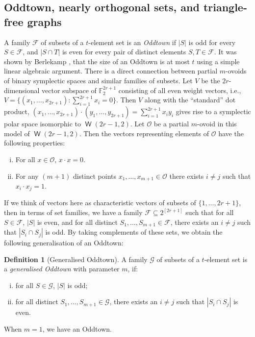 \documentclass[a4paper,11pt]{amsproc}
\theoremstyle{plain}
\theoremstyle{definition}
\newtheorem{Definition} [Theorem] {Definition}
\newcommand{\<}{\langle}
\renewcommand{\>}{\rangle} %
\DeclareMathOperator\w{\mathsf{W}}
\begin{document}
\subsection{Oddtown, nearly orthogonal sets, and triangle-free graphs}\label{connections}

A family $\mathcal{F}$ of subsets of a $t$-element set is an \emph{Oddtown} if $|S|$ is odd for every 
$S\in \mathcal{F}$, and $|S\cap T|$ is even for every pair of distinct elements $S,T\in\mathcal{F}$.
It was shown by Berlekamp \cite{Berlekamp}, that the size of an Oddtown is at most $t$ using a simple linear algebraic argument. There is a direct connection between partial $m$-ovoids of binary symplectic spaces and 
similar families of subsets. Let $V$ be the $2r$-dimensional vector subspace of $\mathbb{F}_2^{2r + 1}$ consisting of all even weight vectors, i.e., $V = \{(x_1, \dots, x_{2r + 1}) : \sum_{i = 1}^{2r + 1} x_i = 0\}$. Then $V$ along with the ``standard'' dot product, $(x_1, \dots, x_{2r + 1}) \cdot (y_1, \dots, y_{2r+1}) = \sum_{i = 1}^{2r+1} x_i y_i$ gives rise to a symplectic polar space isomorphic to $\w(2r - 1, 2)$. 
Let $\mathcal{O}$ be a partial $m$-ovoid in this model of $\w(2r - 1, 2)$. 
Then the vectors representing elements of $\mathcal{O}$ have the following properties:
\begin{enumerate}[(i)]
    \item For all $x \in \mathcal{O}$, $x \cdot x = 0$. 
    \item For any $(m + 1)$ distinct points $x_1, \dots, x_{m + 1} \in \mathcal{O}$ there exists $i \neq j$ such that $x_i \cdot x_j = 1$. 
\end{enumerate}
If we think of vectors here as characteristic vectors of subsets of $\{1,\ldots, 2r+1\}$, then in terms of set families, we have a family $\mathcal{F} \subseteq 2^{[2r + 1]}$ such that
for all $S \in \mathcal{F}$, $|S|$ is even, and 
for all distinct $S_1, \dots, S_{m +1} \in \mathcal{F}$, there exists an $i \neq j$ such that $|S_i \cap S_j|$ is odd.
By taking complements of these sets, we obtain the following generalisation of an Oddtown:

\begin{Definition}[Generalised Oddtown]
A family $\mathcal{G}$ of subsets of a $t$-element set is a \emph{generalised Oddtown}
with parameter $m$, if:
\begin{enumerate}[(i)]
    \item for all $S \in \mathcal{G}$, $|S|$ is odd;
    \item for all distinct $S_1, \dots, S_{m +1} \in \mathcal{G}$, there exists an $i \neq j$ such that $|S_i \cap S_j|$ is even.
\end{enumerate}
When $m=1$, we have an Oddtown.
\end{Definition}
\end{document}
